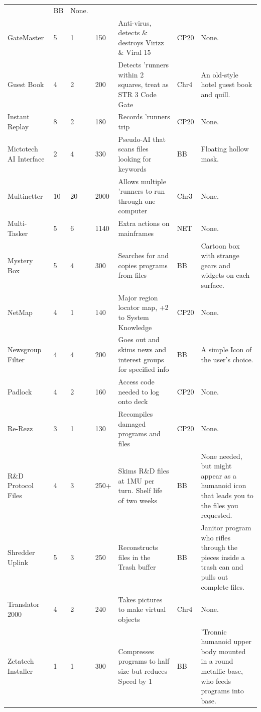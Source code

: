 \documentclass[11pt,twoside,a4paper]{article}
\begin{document}
\begin{landscape}
\begin{longtable}[ht]{ p{3.00cm} p{0.75cm} p{0.75cm} p{1.25cm} p{10.00cm} p{0.75cm} p{7.50cm} }
		&	BB	&		None.	\\
	GateMaster				&	5	&	1	&	150	&	Anti-virus, detects \& destroys Virizz \& Viral 15	
		&	CP20	&		None.	\\
	Guest Book				&	4	&	2	&	200	&	Detects 'runners within 2 squares, treat as STR 3 Code Gate	
		&	Chr4	&		An old-style hotel guest book and quill.	\\
	Instant Replay			&	8	&	2	&	180	&	Records 'runners trip	
		&	CP20	&		None.	\\
	Mictotech AI Interface	&	2	&	4	&	330	&	Pseudo-AI that scans files looking for keywords	
		&	BB	&		Floating hollow mask.	\\
	Multinetter				&	10	&	20	&	2000	&	Allows multiple 'runners to run through one computer	
		&	Chr3	&		None.	\\
	Multi-Tasker			&	5	&	6	&	1140	&	Extra actions on mainframes	
		&	NET	&		None.	\\
	Mystery Box				&	5	&	4	&	300	&	Searches for and copies programs from files	
		&	BB	&		Cartoon box with strange gears and widgets on each surface.	\\
	NetMap					&	4	&	1	&	140	&	Major region locator map, +2 to System Knowledge	
		&	CP20	&		None.	\\
	Newsgroup Filter			&	4	&	4	&	200	&	Goes out and skims news and interest groups for specified info	
		&	BB	&		A simple Icon of the user's choice.	\\
	Padlock					&	4	&	2	&	160	&	Access code needed to log onto deck	
		&	CP20	&		None.	\\
	Re-Rezz					&	3	&	1	&	130	&	Recompiles damaged programs and files	
		&	CP20	&		None.	\\
	R\&D Protocol Files			&	4	&	3	&	250+	&	Skims R\&D files at 1MU per turn. Shelf life of two weeks	
		&	BB	&		None needed, but might appear as a humanoid icon that leads you to the files you requested.	\\
	Shredder Uplink			&	5	&	3	&	250	&	Reconstructs files in the Trash buffer	
		&	BB	&		Janitor program who rifles through the pieces inside a trash can and pulls out complete files.	\\
	Translator 2000			&	4	&	2	&	240	&	Takes pictures to make virtual objects	
		&	Chr4	&		None.	\\
	Zetatech Installer		&	1	&	1	&	300	&	Compresses programs to half size but reduces Speed by 1	
		&	BB	&		'Tronnic humanoid upper body mounted in a round metallic base, who feeds programs into base.	\\



\end{longtable}
\end{landscape}
\end{document}
